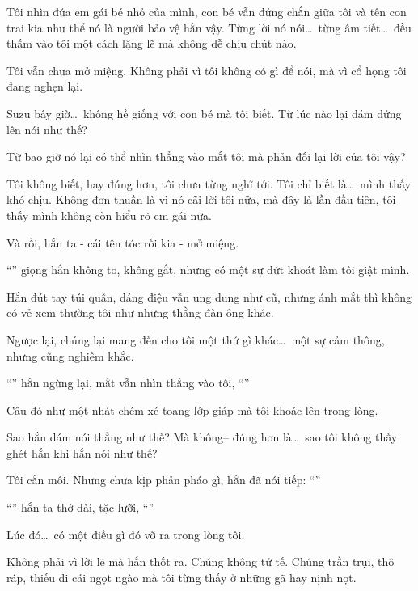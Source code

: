 \documentclass[../main.tex]{subfiles}
\begin{document}

Tôi nhìn đứa em gái bé nhỏ của mình, con bé vẫn đứng chắn giữa tôi và tên con trai kia như thể nó là người bảo vệ hắn vậy. Từng lời nó nói\dots\ từng âm tiết\dots\ đều thấm vào tôi một cách lặng lẽ mà không dễ chịu chút nào.

Tôi vẫn chưa mở miệng. Không phải vì tôi không có gì để nói, mà vì cổ họng tôi đang nghẹn lại.

Suzu bây giờ\dots\ không hề giống với con bé mà tôi biết. Từ lúc nào lại dám đứng lên nói như thế?

Từ bao giờ nó lại có thể nhìn thẳng vào mắt tôi mà phản đối lại lời của tôi vậy?

Tôi không biết, hay đúng hơn, tôi chưa từng nghĩ tới. Tôi chỉ biết là\dots\ mình thấy khó chịu. Không đơn thuần là vì nó cãi lời tôi nữa, mà đây là lần đầu tiên, tôi thấy mình không còn hiểu rõ em gái nữa.

Và rồi, hắn ta - cái tên tóc rối kia - mở miệng.

``'' giọng hắn không to, không gắt, nhưng có một sự dứt khoát làm tôi giật mình.

Hắn đút tay túi quần, dáng điệu vẫn ung dung như cũ, nhưng ánh mắt thì không có vẻ xem thường tôi như những thằng đàn ông khác.

Ngược lại, chúng lại mang đến cho tôi một thứ gì khác\dots\ một sự cảm thông, nhưng cũng nghiêm khắc.

``'' hắn ngừng lại, mắt vẫn nhìn thẳng vào tôi, ``''

Câu đó như một nhát chém xé toang lớp giáp mà tôi khoác lên trong lòng.

Sao hắn dám nói thẳng như thế? Mà không-- đúng hơn là\dots\ sao tôi không thấy ghét hắn khi hắn nói như thế?

Tôi cắn môi. Nhưng chưa kịp phản pháo gì, hắn đã nói tiếp: ``''

``'' hắn ta thở dài, tặc lưỡi, ``''

Lúc đó\dots\ có một điều gì đó vỡ ra trong lòng tôi.

Không phải vì lời lẽ mà hắn thốt ra. Chúng không tử tế. Chúng trần trụi, thô ráp, thiếu đi cái ngọt ngào mà tôi từng thấy ở những gã hay nịnh nọt.
\end{document}
